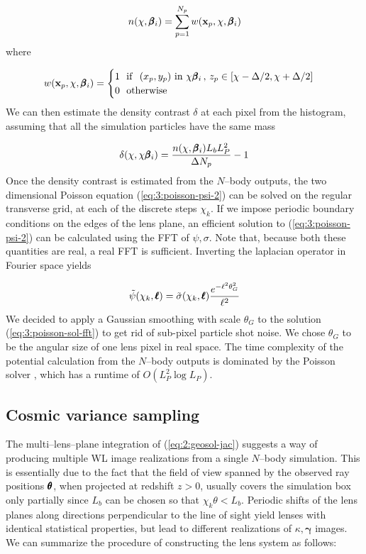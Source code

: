 \begin{equation}
\label{eq:3:number-hist}
n(\chi, \pmb{\beta}_i) = \sum_{p=1}^{N_p}w(\mathbf{x}_p,\chi,\pmb{\beta}_i)
\end{equation}  
%
where 

\begin{equation}
\label{eq:3:number-kernel}
w(\mathbf{x}_p,\chi,\pmb{\beta}_i) = 
\begin{cases}
1 \,\,\,\, {\rm if} \,\,\,\, (x_p,y_p) \,\, {\rm in} \,\, \chi\pmb{\beta}_i \, , \, z_p\in [\chi-\Delta/2,\chi+\Delta/2] \\
0 \,\,\,\, {\rm otherwise}
\end{cases}
\end{equation}
%
We can then estimate the density contrast $\delta$ at each pixel from the histogram, assuming that all the simulation particles have the same mass

\begin{equation}
\label{eq:3:delta-hist}
\delta(\chi,\chi\pmb{\beta}_i) = \frac{n(\chi,\pmb{\beta}_i)L_bL_P^2 }{\Delta N_p} - 1
\end{equation}
%
Once the density contrast is estimated from the $N$--body outputs, the two dimensional Poisson equation (\ref{eq:3:poisson-psi-2}) can be solved on the regular transverse grid, at each of the discrete steps $\chi_k$. If we impose periodic boundary conditions on the edges of the lens plane, an efficient solution to (\ref{eq:3:poisson-psi-2}) can be calculated using the FFT of $\psi,\sigma$. Note that, because both these quantities are real, a real FFT is sufficient. Inverting the laplacian operator in Fourier space yields

\begin{equation}
\label{eq:3:poisson-sol-fft}
\tilde{\psi}(\chi_k,\pmb{\ell}) = \tilde{\sigma}(\chi_k,\pmb{\ell})\frac{e^{-\ell^2\theta_G^2}}{\ell^2}
\end{equation} 
%
We decided to apply a Gaussian smoothing with scale $\theta_G$ to the solution (\ref{eq:3:poisson-sol-fft}) to get rid of sub-pixel particle shot noise. We chose $\theta_G$ to be the angular size of one lens pixel in real space. The time complexity of the potential calculation from the $N$--body outputs is dominated by the Poisson solver \citep{lenstools}, which has a runtime of $O(L_P^2\log L_P)$.

\subsection{Cosmic variance sampling}
\label{sec:3:sampling}
The multi--lens--plane integration of (\ref{eq:2:geosol-jac}) suggests a way of producing multiple WL image realizations from a single $N$--body simulation. This is essentially due to the fact that the field of view spanned by the observed ray positions $\pmb{\theta}$, when projected at redshift $z>0$, usually covers the simulation box only partially since $L_b$ can be chosen so that $\chi_k\theta<L_b$. Periodic shifts of the lens planes along directions perpendicular to the line of sight yield lenses with identical statistical properties, but lead to different realizations of $\kappa,\pmb{\gamma}$ images. We can summarize the procedure of constructing the lens system as follows:


